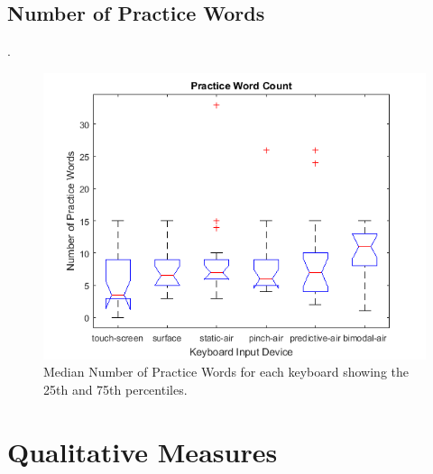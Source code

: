 \subsection{Number of Practice Words}.
\begin{figure}[h]
	\centering
	\includegraphics{fig_num_practice_boxplot}
	\caption[Number of Practice Words Boxplot]{Median Number of Practice Words for each keyboard showing the 25th and 75th percentiles.}
	\label{fig_num_practice_boxplot}
\end{figure}

\clearpage
\section{Qualitative Measures}
